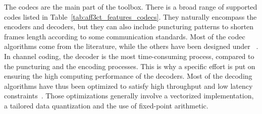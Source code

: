 The codecs are the main part of the toolbox. There is a broad range of supported
codes listed in Table~\ref{tab:aff3ct_features_codecs}. They naturally encompass
the encoders and decoders, but they can also include puncturing patterns to
shorten frames length according to some communication standards. Most of the
codec algorithms come from the literature, while the others have been designed
under \AFFECT~\cite{Tonnellier2016a,Tonnellier2016b,Tonnellier2017,
Leonardon2019}. In channel coding, the decoder is the most time-consuming
process, compared to the puncturing and the encoding processes. This is why a
specific effort is put on ensuring the high computing performance of the
decoders. Most of the decoding algorithms have thus been optimized to satisfy
high throughput and low latency constraints~\cite{LeGal2015a,Cassagne2015c,
Cassagne2016a,Cassagne2016b}. Those optimizations generally involve a vectorized
implementation, a tailored data quantization and the use of fixed-point
arithmetic.

